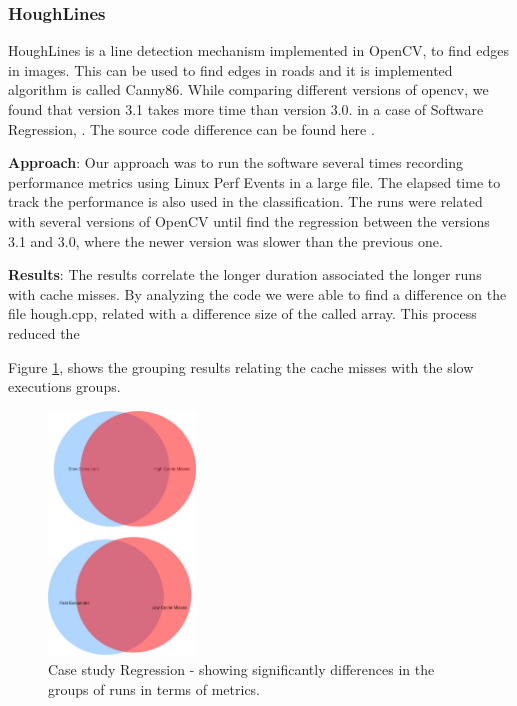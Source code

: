 \subsubsection{HoughLines} 
HoughLines is a line detection mechanism implemented in OpenCV, to find edges in images. This can be used to find edges in roads and it is implemented algorithm is called Canny86. While comparing different versions of opencv, we found that version 3.1 takes more time than version 3.0. in a case of Software Regression, \cite{timeTests}. The source code difference can be found here \cite{opencv_source_diff}.

\textbf{Approach}: Our approach was to run the software several times recording performance metrics using Linux Perf Events in a large file. The elapsed time to track the performance is also used in the classification. The runs were related with several versions of OpenCV until find the regression between the versions 3.1 and 3.0, where the newer version was slower than the previous one.


\textbf{Results}: The results correlate the longer duration associated the longer runs with cache misses. By analyzing the code we were able to find a difference on the file hough.cpp, related with a difference size of the called array. This process reduced the 
    
    Figure \ref{fig:case2}, shows the grouping results relating the cache misses with the slow executions groups.
    
    \begin{figure}[h]
          \centering
            \includegraphics[width=0.350\textwidth]{figures/set_results_cache.jpg}
            \caption{Case study Regression - showing significantly differences in the groups of runs in terms of metrics.}
            \label{fig:case2}
    \end{figure}
    
